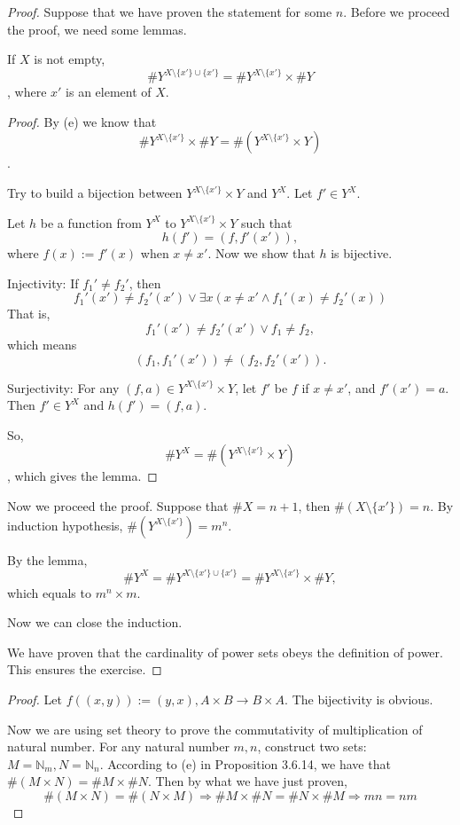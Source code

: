 \begin{proof}
Suppose that we have proven the statement for some $n$. Before we proceed the proof, we need some lemmas.
\begin{lem}
If $X$ is not empty, 
\[
\#Y^{X\setminus\{x'\}\cup\{x'\}} = \#Y^{X\setminus\{x'\}} \times \#Y
\], 
where $x'$ is an element of $X$.
\end{lem}
\begin{proof}
By (e) we know that 
\[
\#Y^{X\setminus\{x'\}} \times \#Y = \#(Y^{X\setminus\{x'\}} \times Y)
\].

Try to build a bijection between $Y^{X\setminus\{x'\}} \times Y$ and $Y^X$. Let $f' \in Y^X$.

Let $h$ be a function from $Y^X$ to $Y^{X\setminus\{x'\}} \times Y$ such that
\[
h(f') = (f,f'(x')), 
\]
where $f(x):=f'(x)$ when $x \neq x'$. Now we show that $h$ is bijective.

Injectivity: 
If ${f_1}' \neq {f_2}'$, then 
\[
{f_1}'(x') \neq {f_2}'(x') \vee \exists x(x \neq x' \wedge {f_1}'(x) \neq {f_2}'(x))
\]
That is, 
\[
{f_1}'(x') \neq {f_2}'(x') \vee f_1 \neq f_2,
\]
which means 
\[
(f_1,{f_1}'(x')) \neq (f_2,{f_2}'(x')).
\]

Surjectivity:
For any $(f,a) \in Y^{X\setminus\{x'\}} \times Y$, let $f'$ be $f$ if $x\neq x'$, and $f'(x') = a$. Then 
$f' \in Y^X$ and $h(f') = (f,a)$.

So, 
\[
\#Y^X = \#(Y^{X\setminus\{x'\}} \times Y)
\], which gives the lemma.
\end{proof}

Now we proceed the proof. Suppose that $\#X = n+1$, then $\#(X \setminus\{x'\}) = n$. By induction 
hypothesis, $\#(Y^{X \setminus\{x'\}}) = m^n$. 

By the lemma, 
\[
\#Y^X = \#Y^{X\setminus\{x'\}\cup\{x'\}} = \#Y^{X\setminus\{x'\}} \times \#Y,
\]
which equals to $m^n \times m$.

Now we can close the induction.

We have proven that the cardinality of power sets obeys the definition of power. This ensures the 
exercise.
\end{proof}

\begin{proof}
Let $f((x,y)):= (y,x), A\times B \rightarrow B \times A$. The bijectivity is obvious. 

Now we are using set theory to prove the commutativity of multiplication of natural number. For any 
natural number $m,n$, construct two sets: $M = \mathbb{N}_{m}, N = \mathbb{N}_{n}$. According to (e) in 
Proposition 3.6.14, we have that $\#(M \times N) = \#M \times \#N$. Then by what we have just proven, 
\[
\#(M \times N) = \#(N \times M) \Longrightarrow \#M \times \#N = \#N \times \#M \Longrightarrow mn = nm
\]
\end{proof}

